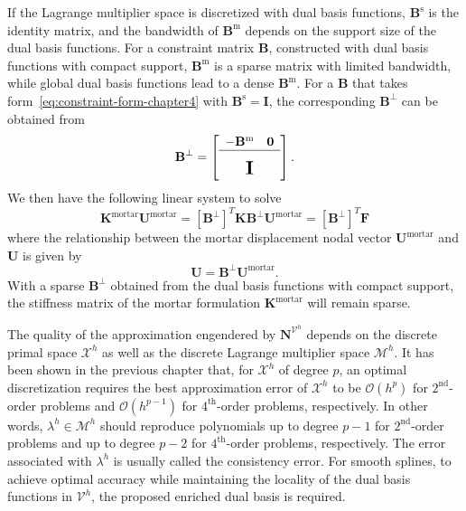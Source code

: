 If the Lagrange multiplier space is discretized with dual basis functions, $\mathbf{B}^\text{s}$ is the identity matrix, and the bandwidth of $\mathbf{B}^\text{m}$ depends on the support size of the dual basis functions. For a constraint matrix $\mathbf{B}$, constructed with dual basis functions with compact support, $\mathbf{B}^\text{m}$ is a sparse matrix with limited bandwidth, while global dual basis functions lead to a dense $\mathbf{B}^\text{m}$. For a $\mathbf{B}$ that takes form~\eqref{eq:constraint-form-chapter4} with $\mathbf{B}^\text{s} = \mathbf{I}$, the corresponding $\mathbf{B}^\perp$ can be obtained from
\begin{equation}
	\mathbf{B}^\perp=
	\left[\begin{array}{cc}
			-\mathbf{B}^\text{m} & \mathbf{0}                                                  \\
			\cline{1-2}
			\multicolumn{2}{c}{\multirow{2}{*}{\raisebox{-2mm}{\scalebox{1.5}{$\mathbf{I}$}}}} \\
			                     &
		\end{array}\right].\label{eq:null-space-chapter4}
\end{equation}
We then have the following linear system to solve
\begin{equation}
	\mathbf{K}^{\text{mortar}}\mathbf{U}^{\text{mortar}}=\left[\mathbf{B}^\perp\right]^T\mathbf{K}\mathbf{B}^\perp\mathbf{U}^{\text{mortar}}=\left[\mathbf{B}^\perp\right]^T\mathbf{F}\label{eq:mortar-form-discretized-chapter4}
\end{equation}
where the relationship between the mortar displacement nodal vector $\mathbf{U}^{\text{mortar}}$ and $\mathbf{U}$ is given by
\begin{equation}
	\mathbf{U}=\mathbf{B}^\perp\mathbf{U}^{\text{mortar}}.
\end{equation}
With a sparse $\mathbf{B}^\perp$ obtained from the dual basis functions with compact support, the stiffness matrix of the mortar formulation $\mathbf{K}^{\text{mortar}}$ will remain sparse.\par

The quality of the approximation engendered by $\mathbf{N}^{\mathcal{V}^h}$ depends on the discrete primal space $\mathcal{X}^h$ as well as the discrete Lagrange multiplier space $\mathcal{M}^h$. It has been shown in the previous chapter that, for $\mathcal{X}^h$ of degree $p$, an optimal discretization requires the best approximation error of $\mathcal{X}^h$ to be $\mathcal{O}(h^p)$ for $2^\text{nd}$-order problems and $\mathcal{O}(h^{p-1})$ for $4^\text{th}$-order problems, respectively. In other words, $\lambda^h\in\mathcal{M}^h$ should reproduce polynomials up to degree $p-1$ for $2^\text{nd}$-order problems and up to degree $p-2$ for $4^\text{th}$-order problems, respectively. The error associated with $\lambda^h$ is usually called the consistency error. For smooth splines, to achieve optimal accuracy while maintaining the locality of the dual basis functions in $\mathcal{V}^h$, the proposed enriched dual basis is required. \par

